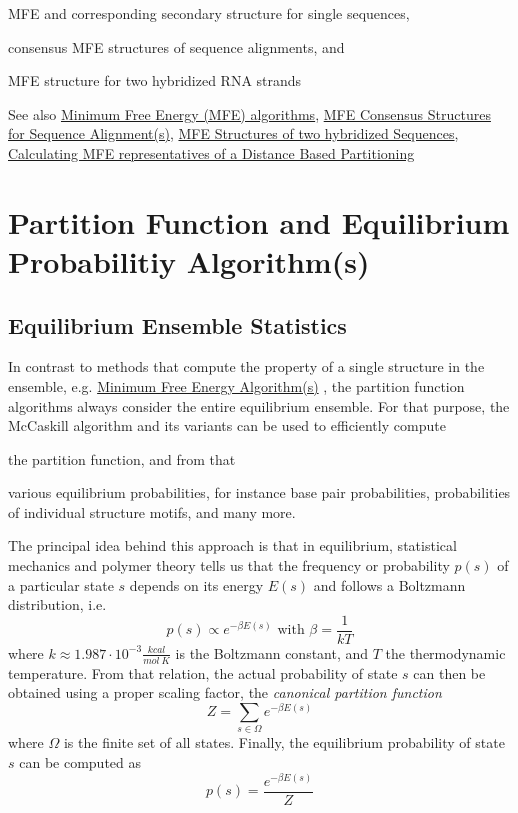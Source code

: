 \begin{DoxyItemize}
\item M\+FE and corresponding secondary structure for single sequences,
\item consensus M\+FE structures of sequence alignments, and
\item M\+FE structure for two hybridized R\+NA strands
\end{DoxyItemize}

\begin{DoxySeeAlso}{See also}
\hyperlink{group__mfe__fold}{Minimum Free Energy (M\+FE) algorithms}, \hyperlink{group__consensus__mfe__fold}{M\+FE Consensus Structures for Sequence Alignment(s)}, \hyperlink{group__mfe__cofold}{M\+FE Structures of two hybridized Sequences}, \hyperlink{group__kl__neighborhood__mfe}{Calculating M\+FE representatives of a Distance Based Partitioning}
\end{DoxySeeAlso}
 \hypertarget{pf_algorithm}{}\section{Partition Function and Equilibrium Probabilitiy Algorithm(s)}\label{pf_algorithm}
\hypertarget{pf_algorithm_sec_pf_intro}{}\subsection{Equilibrium Ensemble Statistics}\label{pf_algorithm_sec_pf_intro}
In contrast to methods that compute the property of a single structure in the ensemble, e.\+g. \hyperlink{mfe_algorithm}{Minimum Free Energy Algorithm(s)} , the partition function algorithms always consider the entire equilibrium ensemble. For that purpose, the Mc\+Caskill algorithm \cite{mccaskill:1990} and its variants can be used to efficiently compute


\begin{DoxyItemize}
\item the partition function, and from that
\item various equilibrium probabilities, for instance base pair probabilities, probabilities of individual structure motifs, and many more.
\end{DoxyItemize}

The principal idea behind this approach is that in equilibrium, statistical mechanics and polymer theory tells us that the frequency or probability $p(s)$ of a particular state $s$ depends on its energy $E(s)$ and follows a Boltzmann distribution, i.\+e. \[ p(s) \propto e^{-\beta E(s)} \text{ with } \beta = \frac{1}{kT} \] where $k \approx 1.987 \cdot 10^{-3} \frac{kcal}{mol~K}$ is the Boltzmann constant, and $T$ the thermodynamic temperature. From that relation, the actual probability of state $s$ can then be obtained using a proper scaling factor, the {\itshape canonical partition function} \[ Z = \sum_{s \in \Omega} e^{-\beta E(s)} \] where $\Omega$ is the finite set of all states. Finally, the equilibrium probability of state $s$ can be computed as \[ p(s) = \frac{e^{-\beta E(s)}}{Z} \]


